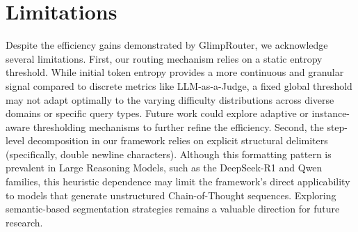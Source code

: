 \documentclass[11pt]{article}
\newcommand{\approach}{{GlimpRouter}\xspace}
\begin{document}
\section*{Limitations}

Despite the efficiency gains demonstrated by \approach, we acknowledge several limitations.
First, our routing mechanism relies on a static entropy threshold. While initial token entropy provides a more continuous and granular signal compared to discrete metrics like LLM-as-a-Judge, a fixed global threshold may not adapt optimally to the varying difficulty distributions across diverse domains or specific query types. Future work could explore adaptive or instance-aware thresholding mechanisms to further refine the efficiency.
Second, the step-level decomposition in our framework relies on explicit structural delimiters (specifically, double newline characters). Although this formatting pattern is prevalent in Large Reasoning Models, such as the DeepSeek-R1 and Qwen families, this heuristic dependence may limit the framework's direct applicability to models that generate unstructured Chain-of-Thought sequences. Exploring semantic-based segmentation strategies remains a valuable direction for future research.




\end{document}

